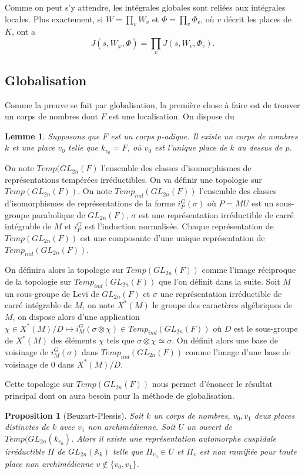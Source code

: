 \documentclass{amsart}
\newtheorem{proposition}{Proposition}[section]
\newtheorem{lemme}{Lemme}[section]
\begin{document}
 Comme on peut s'y attendre, les intégrales globales sont reliées aux intégrales locales. Plus exactement, si $W=\prod_v W_v$ et $\Phi = \prod_v \Phi_v$, où $v$ décrit les places de $K$, ont a
 \begin{equation}
 J(s,W_\varphi,\Phi)=\prod_v J(s, W_v, \Phi_v).
 \end{equation}
 
 \subsection{Globalisation}
 
 Comme la preuve se fait par globalisation, la première chose à faire est de trouver un corps de nombres dont $F$ est une localisation. On dispose du
 \begin{lemme}
 Supposons que $F$ est un corps $p$-adique. Il existe un corps de nombres $k$ et une place $v_0$ telle que $k_{v_0} = F$, où $v_0$ est l'unique place de $k$ au dessus de $p$.
 \end{lemme}
 
 On note $Temp(GL_{2n}(F)$ l'ensemble des classes d'isomorphismes de représentations tempérées irréductibles. On va définir une topologie sur $Temp(GL_{2n}(F))$. On note $Temp_{ind}(GL_{2n}(F))$ l'ensemble des classes d'isomorphismes de représentations de la forme $i_P^G(\sigma)$ où $P=MU$ est un sous-groupe parabolique de $GL_{2n}(F)$, $\sigma$ est une représentation irréductible de carré intégrable de $M$ et $i_P^G$ est l'induction normalisée. Chaque représentation de $Temp(GL_{2n}(F))$ est une composante d'une unique représentation de $Temp_{ind}(GL_{2n}(F))$.
 
 On définira alors la topologie sur $Temp(GL_{2n}(F))$ comme l'image réciproque de la topologie sur $Temp_{ind}(GL_{2n}(F))$ que l'on définit dans la suite. Soit $M$ un sous-groupe de Levi de $GL_{2n}(F)$ et $\sigma$ une représentation irréductible de carré intégrable de $M$, on note $X^*(M)$ le groupe des caractères algébriques de $M$, on dispose alors d'une application $\chi \in X^*(M)/D \mapsto i^G_M(\sigma \otimes \chi) \in Temp_{ind}(GL_{2n}(F))$ où $D$ est le sous-groupe de $X^*(M)$ des éléments $\chi$ tels que $\sigma \otimes \chi \simeq \sigma$. On définit alors une base de voisinage de $i^G_M(\sigma)$ dans $Temp_{ind}(GL_{2n}(F))$ comme l'image d'une base de voisinage de $0$ dans $X^*(M)/D$.
 
 Cette topologie sur $Temp(GL_{2n}(F))$ nous permet d'énoncer le résultat principal dont on aura besoin pour la méthode de globalisation.
 \begin{proposition}[Beuzart-Plessis]
 \label{globalisation}
 Soit $k$ un corps de nombres, $v_0,v_1$ deux places distinctes de $k$ avec $v_1$ non archimédienne. Soit $U$ un ouvert de $Temp(GL_{2n}(k_{v_0})$. Alors il existe une représentation automorphe cuspidale irréductible $\Pi$ de $GL_{2n}(\mathbb{A}_k)$ telle que $\Pi_{v_0} \in U$ et $\Pi_v$ est non ramifiée pour toute place non archimédienne $v \not \in \{v_0,v_1\}$.
 \end{proposition}
 
\end{document}
